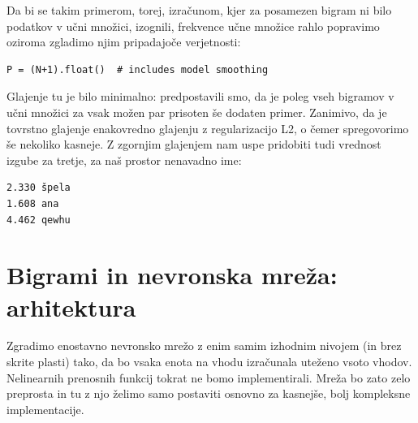 Da bi se takim primerom, torej, izračunom, kjer za posamezen bigram ni bilo podatkov v učni množici, izognili, frekvence učne množice rahlo popravimo oziroma zgladimo njim pripadajoče verjetnosti:
%
\vspace*{3mm}
\begin{lstlisting}
P = (N+1).float()  # includes model smoothing
\end{lstlisting}
%
Glajenje tu je bilo minimalno: predpostavili smo, da je poleg vseh bigramov v učni množici za vsak možen par prisoten še dodaten primer. Zanimivo, da je tovrstno glajenje enakovredno glajenju z regularizacijo L2, o čemer spregovorimo še nekoliko kasneje. Z zgornjim glajenjem nam uspe pridobiti tudi vrednost izgube za tretje, za naš prostor nenavadno ime:
%
%
\vspace*{3mm}
\begin{lstlisting}
2.330 špela
1.608 ana
4.462 qewhu
\end{lstlisting}



\section{Bigrami in nevronska mreža: arhitektura}

Zgradimo enostavno nevronsko mrežo z enim samim izhodnim nivojem (in brez skrite plasti) tako, da bo vsaka enota na vhodu izračunala uteženo vsoto vhodov. Nelinearnih prenosnih funkcij tokrat ne bomo implementirali. Mreža bo zato zelo preprosta in tu z njo želimo samo postaviti osnovno za kasnejše, bolj kompleksne implementacije. 

